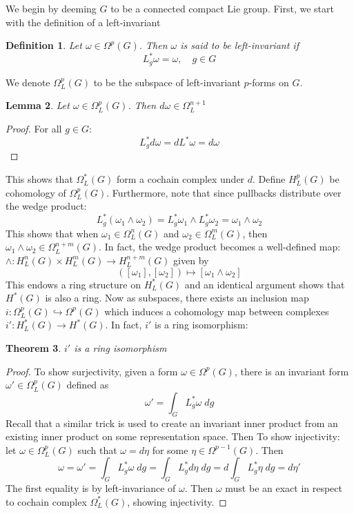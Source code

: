 \documentclass[12pt]{amsart}
\newtheorem{theorem}{Theorem}[section]
\newtheorem{lemma}[theorem]{Lemma}
\newtheorem{definition}[theorem]{Definition}
\numberwithin{equation}{section}
\begin{document}
We begin by deeming $G$ to be a connected compact Lie group. First, we start with the definition of a left-invariant
%
\begin{definition}
  Let $\omega \in \Omega^p(G)$. Then $\omega$ is said to be \emph{left-invariant} if
  \begin{equation}
    L_g^*\omega = \omega, \quad g \in G
  \end{equation}
\end{definition}
%
\noindent We denote $\Omega_L^p(G)$ to be the subspace of left-invariant $p$-forms on $G$.
%
\begin{lemma}
  Let $\omega \in \Omega_L^p(G)$. Then $d\omega \in \Omega_L^{n+1}$
\end{lemma}
\begin{proof}
  For all $g \in G$:
  $$L^*_gd\omega = dL^*\omega = d\omega$$
\end{proof}
\noindent This shows that $\Omega_L^{*}(G)$ form a cochain complex under $d$. Define $H^p_L(G)$ be cohomology of $\Omega^p_L(G)$. Furthermore, note that since pullbacks distribute over the wedge product:
$$ L^*_g(\omega_1 \wedge \omega_2) = L^*_g\omega_1 \wedge L^*_g\omega_2  = \omega_1 \wedge \omega_2$$
This shows that when $\omega_1 \in \Omega_L^n(G)$ and $\omega_2 \in \Omega_L^m(G)$, then $\omega_1 \wedge \omega_2 \in \Omega_L^{n+m}(G)$. In fact, the wedge product becomes a well-defined map: $\wedge: H^n_L(G) \times H^{m}_L(G) \rightarrow H^{n+m}_L(G)$ given by $$([\omega_1] ,[\omega_2]) \mapsto [\omega_1 \wedge \omega_2]$$
This endows a ring structure on $H^{*}_L(G)$ and an identical argument shows that $H^*(G)$ is also a ring. Now as subspaces, there exists an inclusion map $i: \Omega_L^p(G) \hookrightarrow \Omega^p(G)$ which induces a cohomology map between complexes $i': H^*_L(G) \rightarrow H^*(G)$. In fact, $i'$ is a ring isomorphism:
%
\begin{theorem} \label{leftrep}
$i'$ is a ring isomorphism
\end{theorem}
%
\begin{proof}
  To show surjectivity, given a form $\omega \in \Omega^p(G)$, there is an invariant form $\omega' \in \Omega^p_L(G)$ defined as
  \begin{equation}
    \omega' = \int_G L^*_g\omega \; dg
  \end{equation}
  Recall that a similar trick is used to create an invariant inner product from an existing inner product on some representation space. Then
  To show injectivity: let $\omega \in \Omega_L^p(G)$ such that $\omega = d\eta$ for some $\eta \in \Omega^{p-1}(G)$. Then
  $$\omega = \omega' = \int_G L^*_g\omega \; dg = \int_G L^*_g d\eta \; dg = d \int_G L^*_g \eta \; dg = d\eta' $$
  The first equality is by left-invariance of $\omega$. Then $\omega$ must be an exact in respect to cochain complex $\Omega^*_L(G)$, showing injectivity.
\end{proof}
\end{document}
